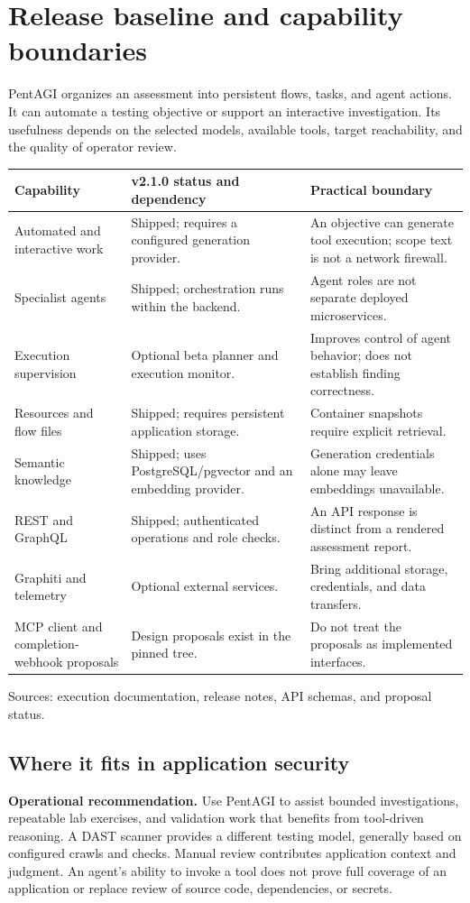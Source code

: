 \documentclass[11pt,letterpaper]{article}
\newcommand{\src}[1]{\cite{#1}}
\begin{document}
\clearpage
\section{Release baseline and capability boundaries}
\label{sec:baseline}
PentAGI organizes an assessment into persistent flows, tasks, and agent actions.
It can automate a testing objective or support an interactive investigation.
Its usefulness depends on the selected models, available tools, target
reachability, and the quality of operator review. \src{flow}

\begin{tabularx}{\textwidth}{@{}L{0.22\textwidth}YY@{}}
\toprule
\textbf{Capability} & \textbf{v2.1.0 status and dependency} & \textbf{Practical boundary}\\
\midrule
Automated and interactive work & Shipped; requires a configured generation provider. &
An objective can generate tool execution; scope text is not a network firewall.\\
Specialist agents & Shipped; orchestration runs within the backend. &
Agent roles are not separate deployed microservices.\\
Execution supervision & Optional beta planner and execution monitor. &
Improves control of agent behavior; does not establish finding correctness.\\
Resources and flow files & Shipped; requires persistent application storage. &
Container snapshots require explicit retrieval.\\
Semantic knowledge & Shipped; uses PostgreSQL/pgvector and an embedding provider. &
Generation credentials alone may leave embeddings unavailable.\\
REST and GraphQL & Shipped; authenticated operations and role checks. &
An API response is distinct from a rendered assessment report.\\
Graphiti and telemetry & Optional external services. &
Bring additional storage, credentials, and data transfers.\\
MCP client and completion-webhook proposals & Design proposals exist in the pinned tree. &
Do not treat the proposals as implemented interfaces.\\
\bottomrule
\end{tabularx}
{\small Sources: execution documentation, release notes, API schemas, and
proposal status. \src{flow,release,swagger,graphql,mcp,concurrency}}

\subsection{Where it fits in application security}
\textbf{Operational recommendation.} Use PentAGI to assist bounded investigations,
repeatable lab exercises, and validation work that benefits from tool-driven
reasoning. A DAST scanner provides a different testing model, generally based on
configured crawls and checks. Manual review contributes application context and
judgment. An agent's ability to invoke a tool does not prove full coverage of
an application or replace review of source code, dependencies, or secrets.
\end{document}
